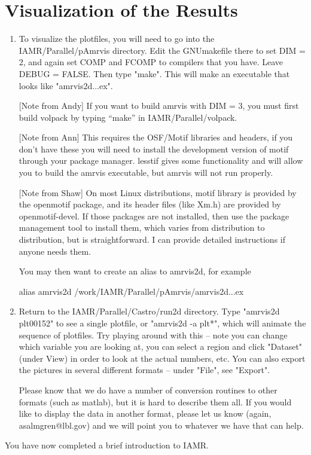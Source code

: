 \section{Visualization of the Results}

\begin{enumerate}

\item To visualize the plotfiles, you will need to go into the IAMR/Parallel/pAmrvis 
directory. Edit the GNUmakefile there to set DIM = 2, and again set COMP and FCOMP to 
compilers that you have. Leave DEBUG = FALSE. Then type "make".  This will make an 
executable that looks like "amrvis2d...ex".

[Note from Andy] If you want to build amrvis with DIM = 3, you must first build volpack by 
typing ``make'' in IAMR/Parallel/volpack.

[Note from Ann] This requires the OSF/Motif libraries and headers, if you don't have these 
you will need to install the development version of motif through your package manager. 
lesstif gives some functionality and will allow you to build the amrvis executable, 
but amrvis will not run properly.

[Note from Shaw] On most Linux distributions, motif library is provided by the openmotif package, 
and its header files (like Xm.h) are provided by openmotif-devel. If those packages are not 
installed, then use the package management tool to install them, which varies from distribution 
to distribution, but is straightforward. I can provide detailed instructions if anyone needs them.

You may then want to create an alias to amrvis2d, for example

alias amrvis2d /work/IAMR/Parallel/pAmrvis/amrvis2d...ex

\item Return to the IAMR/Parallel/Castro/run2d directory. 
Type "amrvis2d plt00152" to see a single plotfile, or "amrvis2d -a plt*", 
which will animate the sequence of plotfiles. Try playing around with this -- 
note you can change which variable you are looking at, you can select a region and 
click "Dataset" (under View) in order to look at the actual numbers, etc. 
You can also export the pictures in several different formats -- under "File", see "Export".

Please know that we do have a number of conversion routines to other 
formats (such as matlab), but it is hard to describe them all. 
If you would like to display the data in another format, please let us 
know (again, asalmgren@lbl.gov) and we will point you to whatever we have that can help.

\end{enumerate}

You have now completed a brief introduction to IAMR. 

